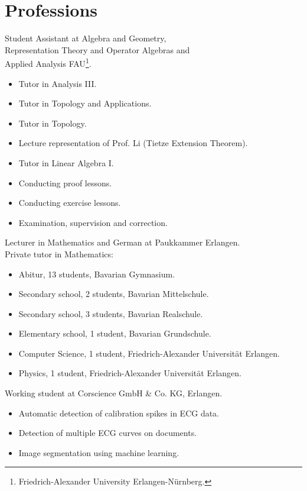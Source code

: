 \documentclass[a4paper, 11pt]{article}
\newcommand{\years}[1]{\marginnote{\scriptsize #1}}
\begin{document}
\section*{Professions}
\years{2023--25} Student Assistant at Algebra and Geometry, \\
Representation Theory and Operator Algebras and \\
Applied Analysis FAU\footnote{Friedrich-Alexander University Erlangen-Nürnberg.}.
\begin{itemize}
	\item Tutor in \glqq Analysis III\grqq.
	\item Tutor in \glqq Topology and Applications\grqq.
	\item Tutor in \glqq Topology\grqq.
	\item Lecture representation of Prof. Li (Tietze Extension Theorem).
	\item Tutor in \glqq Linear Algebra I\grqq.
	\item Conducting proof lessons.
	\item Conducting exercise lessons.
	\item Examination, supervision and correction.
\end{itemize}
\years{2025} Lecturer in Mathematics and German at Paukkammer Erlangen.\\
\years{2024--25} Private tutor in Mathematics:
\begin{itemize}
	\item Abitur, 13 students, Bavarian Gymnasium.
	\item Secondary school, 2 students, Bavarian Mittelschule.
	\item Secondary school, 3 students, Bavarian Realschule.
	\item Elementary school, 1 student, Bavarian Grundschule.
	\item Computer Science, 1 student, Friedrich-Alexander Universität Erlangen. 
	\item Physics, 1 student, Friedrich-Alexander Universität Erlangen. 
\end{itemize}
\years{2021--22} Working student at Corscience GmbH \& Co. KG, Erlangen.
\begin{itemize}
	\item Automatic detection of calibration spikes in ECG data.
	\item Detection of multiple ECG curves on documents.
	\item Image segmentation using machine learning.
\end{itemize}
\end{document}
